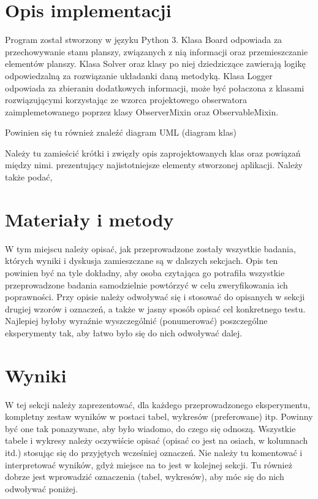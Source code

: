 \documentclass{classrep.cls}
\begin{document}
    \section{Opis implementacji}
    {\color{blue}
    Program został stworzony w języku Python 3.
    Klasa Board odpowiada za przechowywanie stanu planszy, związanych z nią informacji oraz
    przemieszczanie elementów planszy.
    Klasa Solver oraz klasy po niej dziedziczące zawierają logikę odpowiedzalną za rozwiązanie układanki daną metodyką.
    Klasa Logger odpowiada za zbieraniu dodatkowych informacji, może być połaczona z klasami rozwiązującymi
    korzystając ze wzorca projektowego obserwatora zaimplemetowanego poprzez klasy ObserverMixin oraz ObservableMixin.

    Powinien się tu również znaleźć diagram UML (diagram klas)


    Należy tu zamieścić krótki i zwięzły opis zaprojektowanych klas oraz powiązań
    między nimi.
        prezentujący najistotniejsze elementy stworzonej aplikacji. Należy także podać,




    }

    \section{Materiały i metody}
    {\color{blue}
    W tym miejscu należy opisać, jak przeprowadzone zostały wszystkie badania,
        których wyniki i dyskusja zamieszczane są w dalszych sekcjach. Opis ten
        powinien być na tyle dokładny, aby osoba czytająca go potrafiła wszystkie
    przeprowadzone badania samodzielnie powtórzyć w celu zweryfikowania ich
    poprawności. Przy opisie należy odwoływać się i stosować do
    opisanych w sekcji drugiej wzorów i oznaczeń, a także w jasny sposób opisać
    cel konkretnego testu. Najlepiej byłoby wyraźnie wyszczególnić (ponumerować)
        poszczególne eksperymenty tak, aby łatwo było się do nich odwoływać dalej.}

    \section{Wyniki}
    {\color{blue}
    W tej sekcji należy zaprezentować, dla każdego przeprowadzonego eksperymentu,
        kompletny zestaw wyników w postaci tabel, wykresów (preferowane) itp. Powinny
    być one tak ponazywane, aby było wiadomo, do czego się odnoszą. Wszystkie
    tabele i wykresy należy oczywiście opisać (opisać co jest na osiach, w
    kolumnach itd.) stosując się do przyjętych wcześniej oznaczeń. Nie należy tu
    komentować i interpretować wyników, gdyż miejsce na to jest w kolejnej sekcji.
    Tu również dobrze jest wprowadzić oznaczenia (tabel, wykresów), aby móc się do
    nich odwoływać poniżej.}
\end{document}
